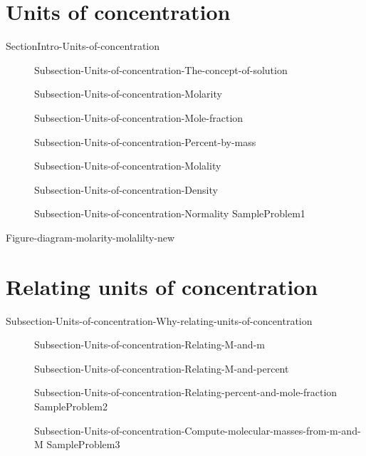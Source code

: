 \documentclass[main.tex]{subfiles}
\newcommand\chapterlabel{Ch-solutions}\setcounter{figurenewcounter}{0}\setcounter{tablenewcounter}{0}\setcounter{formulanewcounter}{0}\chapterpicture{../{\chapterlabel}/figure1}\chapterpicturelabel{PxFuel}
\begin{document}
\section{Units of concentration}{SectionIntro-Units-of-concentration}
\sloppy \begin{description}
\item[] {Subsection-Units-of-concentration-The-concept-of-solution}
\item[] {Subsection-Units-of-concentration-Molarity}
\item[] {Subsection-Units-of-concentration-Mole-fraction}
\item[] {Subsection-Units-of-concentration-Percent-by-mass}
\item[] {Subsection-Units-of-concentration-Molality}
\item[] {Subsection-Units-of-concentration-Density}
\item[] {Subsection-Units-of-concentration-Normality}
{SampleProblem1}
\end{description}

{Figure-diagram-molarity-molalilty-new}
\section{Relating units of concentration}{Subsection-Units-of-concentration-Why-relating-units-of-concentration}
\sloppy \begin{description}
 \item[] {Subsection-Units-of-concentration-Relating-M-and-m}
\item[] {Subsection-Units-of-concentration-Relating-M-and-percent}
\item[] {Subsection-Units-of-concentration-Relating-percent-and-mole-fraction}
{SampleProblem2}
\item[] {Subsection-Units-of-concentration-Compute-molecular-masses-from-m-and-M}
{SampleProblem3}
\end{description}
\end{document}
